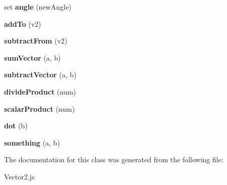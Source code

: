 \begin{DoxyCompactItemize}
set {\bfseries angle} (new\+Angle)
\item 
\mbox{\label{class_vector2_a6c7bea3f52d9b9d730bb7a2dea713ce8}} 
{\bfseries add\+To} (v2)
\item 
\mbox{\label{class_vector2_a8d141554ad108adfc21ba3870afccbf6}} 
{\bfseries subtract\+From} (v2)
\item 
\mbox{\label{class_vector2_ac424d99c6d78984019be70ccbb8de08c}} 
{\bfseries sum\+Vector} (a, b)
\item 
\mbox{\label{class_vector2_a6fd16613aa5784a51cb82c7e1bd41459}} 
{\bfseries subtract\+Vector} (a, b)
\item 
\mbox{\label{class_vector2_a3f64bdbece89fabaeebd6a3e153f6095}} 
{\bfseries divide\+Product} (num)
\item 
\mbox{\label{class_vector2_a2baa172fc92fd53bb236e09e94779d66}} 
{\bfseries scalar\+Product} (num)
\item 
\mbox{\label{class_vector2_ab0c961a0877185a54398a1bacd35690a}} 
{\bfseries dot} (b)
\item 
\mbox{\label{class_vector2_af617cd895fea900de3a9975b65947824}} 
{\bfseries something} (a, b)
\end{DoxyCompactItemize}


The documentation for this class was generated from the following file\+:\begin{DoxyCompactItemize}
\item 
Vector2.\+js\end{DoxyCompactItemize}
